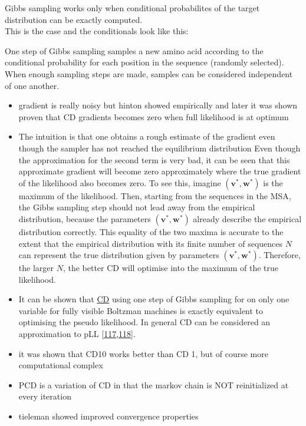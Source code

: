 \documentclass[12pt,a4paper,twoside]{book}
\providecommand{\tightlist}{%
  \setlength{\itemsep}{0pt}\setlength{\parskip}{0pt}}
\renewcommand{\v}{\mathbf{v}}
\newcommand{\w}{\mathbf{w}}
\theoremstyle{definition}
\theoremstyle{definition}
\theoremstyle{remark}
\begin{document}
Gibbs sampling works only when conditional probabilites of the target
distribution can be exactly computed.\\
This is the case and the conditionals look like this:

One step of Gibbs sampling samples a new amino acid according to the
conditional probability for each position in the sequence (randomly
selected). When enough sampling steps are made, samples can be
considered independent of one another.

\begin{itemize}
\tightlist
\item
  gradient is really noisy but hinton showed empirically and later it
  was shown proven that CD gradients becomes zero when full likelihood
  is at optimum
\item
  The intuition is that one obtains a rough estimate of the gradient
  even though the sampler has not reached the equilibrium distribution
  Even though the approximation for the second term is very bad, it can
  be seen that this approximate gradient will become zero approximately
  where the true gradient of the likelihood also becomes zero. To see
  this, imagine \((\v^*, \w^*)\) is the maximum of the likelihood. Then,
  starting from the sequences in the MSA, the Gibbs sampling step should
  not lead away from the empirical distribution, because the parameters
  \((\v^*, \w^*)\) already describe the empirical distribution
  correctly. This equality of the two maxima is accurate to the extent
  that the empirical distribution with its finite number of sequences
  \(N\) can represent the true distribution given by parameters
  \((\v^*, \w^*)\). Therefore, the larger \(N\), the better CD will
  optimise into the maximum of the true likelihood.
\item
  It can be shown that \protect\hyperlink{abbrev}{CD} using one step of
  Gibbs sampling for on only one variable for fully visible Boltzman
  machines is exactly equivalent to optimising the pseudo likelihood. In
  general CD can be considered an approximation to pLL
  {[}\protect\hyperlink{ref-Hyvarinen2006}{117},\protect\hyperlink{ref-Hyvarinen2007}{118}{]}.
\item
  it was shown that CD10 works better than CD 1, but of course more
  computational complex
\item
  PCD is a variation of CD in that the markov chain is NOT reinitialized
  at every iteration
\item
  tieleman showed improved convergence properties
\end{itemize}
\end{document}
